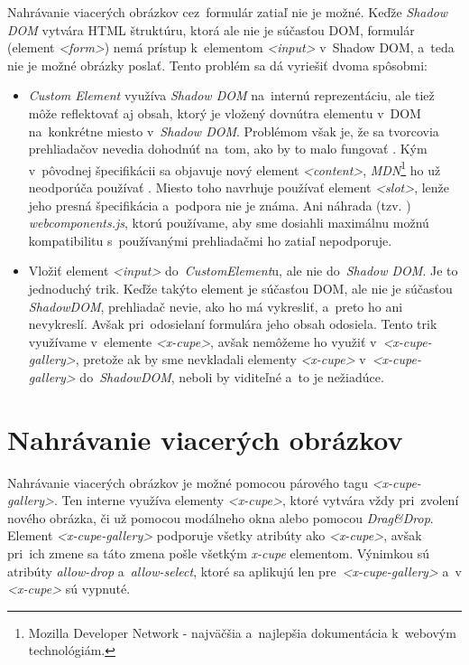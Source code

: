 Nahrávanie viacerých obrázkov cez~formulár zatiaľ nie je možné. Keďže \emph{Shadow DOM} vytvára HTML štruktúru, ktorá ale nie je súčasťou DOM, formulár (element \emph{<form>}) nemá prístup k~elementom \emph{<input>} v~Shadow DOM, a~teda nie je možné obrázky poslať. Tento problém sa dá vyriešiť dvoma spôsobmi:

\begin{itemize}
	\item \emph{Custom Element} využíva \emph{Shadow DOM} na~internú reprezentáciu, ale tiež môže reflektovať aj obsah, ktorý je vložený dovnútra elementu v~DOM na~konkrétne miesto v~\emph{Shadow DOM}. Problémom však je, že sa tvorcovia prehliadačov nevedia dohodnúť na~tom, ako by to malo fungovať \cite{WebComponents_state}. Kým v~pôvodnej špecifikácii sa objavuje nový element \emph{<content>}, \emph{MDN}\footnote{Mozilla Developer Network - najväčšia a~najlepšia dokumentácia k~webovým technológiám.} ho už neodporúča používať \cite{MDN_Content_Element}. Miesto toho navrhuje používať element \emph{<slot>}, lenže jeho presná špecifikácia a~podpora nie je známa. Ani náhrada (tzv. ) \emph{webcomponents.js}, ktorú používame, aby sme dosiahli maximálnu možnú kompatibilitu s~používanými prehliadačmi ho zatiaľ nepodporuje.
	\item Vložiť element \emph{<input>} do~\emph{CustomElement}u, ale nie do~\emph{Shadow DOM}. Je to jednoduchý trik. Keďže takýto element je súčasťou DOM, ale nie je súčasťou \emph{ShadowDOM}, prehliadač nevie, ako ho má vykresliť, a~preto ho ani nevykreslí. Avšak pri~odosielaní formulára jeho obsah odosiela. Tento trik využívame v~elemente \emph{<x-cupe>}, avšak nemôžeme ho využiť v~\emph{<x-cupe-gallery>}, pretože ak by sme nevkladali elementy \emph{<x-cupe>} v~\emph{<x-cupe-gallery>} do~\emph{ShadowDOM}, neboli by viditeľné a~to je nežiadúce.
\end{itemize}


\section{Nahrávanie viacerých obrázkov}

Nahrávanie viacerých obrázkov je možné pomocou párového tagu \emph{<x-cupe-gallery>}. Ten interne využíva elementy \emph{<x-cupe>}, ktoré vytvára vždy pri~zvolení nového obrázka, či už pomocou modálneho okna alebo pomocou \emph{Drag\&Drop}. Element \emph{<x-cupe-gallery>} podporuje všetky atribúty ako \emph{<x-cupe>}, avšak pri~ich zmene sa táto zmena pošle všetkým \emph{x-cupe} elementom. Výnimkou sú atribúty \emph{allow-drop} a~\emph{allow-select}, ktoré sa aplikujú len pre~\emph{<x-cupe-gallery>} a~v \emph{<x-cupe>} sú vypnuté.


